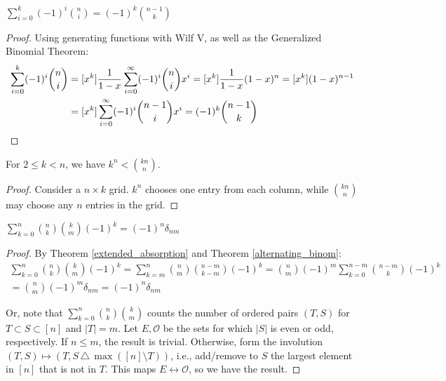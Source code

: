 \documentclass[a4paper]{article}
\begin{document}
\begin{theorem}\label{truncate_alt_binom}
$\displaystyle\sum_{i=0}^k(-1)^i\binom ni=(-1)^k\binom{n-1}k$

\begin{hl}
\begin{proof}
Using generating functions with Wilf V, as well as the Generalized Binomial Theorem:
\begin{align*}
\sum_{i=0}^k(-1)^i\binom ni
&=[x^k]\frac1{1-x}\sum_{i=0}^\infty (-1)^i\binom ni x^i
=[x^k]\frac1{1-x}(1-x)^n
=[x^k](1-x)^{n-1}\\
&=[x^k]\sum_{i=0}^\infty(-1)^i\binom{n-1}ix^i
=(-1)^k\binom{n-1}k\qedhere
\end{align*}
\end{proof}
\end{hl}
\end{theorem}

\begin{example}
For $2\leq k<n$, we have $k^n<\binom{kn}n$.

\begin{hl}
\begin{proof}
Consider a $n\times k$ grid. $k^n$ chooses one entry from each column, while $\binom{kn}n$ may choose any $n$ entries in the grid.
\end{proof}
\end{hl}

\begin{lemma}\label{bin_inv_prep_1}
$\displaystyle\sum_{k=0}^n\binom nk\binom km(-1)^k=(-1)^n\delta_{nm}$

\begin{hl}
\begin{proof}
By Theorem \ref{extended_absorption} and Theorem \ref{alternating_binom}:
\begin{multline*}
\sum_{k=0}^n\binom nk\binom km(-1)^k
=\sum_{k=m}^n\binom nm\binom{n-m}{k-m}(-1)^k
=\binom nm(-1)^m\sum_{k=0}^{n-m}\binom{n-m}{k}(-1)^k\\
=\binom nm(-1)^m\delta_{nm}
=(-1)^n\delta_{nm}
\end{multline*}

Or, note that $\sum_{k=0}^n\binom nk\binom km$ counts the number of ordered pairs $(T,S)$ for $T\subset S\subset [n]$ and $|T|=m$. Let $E,\mathcal O$ be the sets for which $|S|$ is even or odd, respectively. If $n\leq m$, the result is trivial. Otherwise, form the involution $(T,S)\mapsto (T, S\,\triangle\,\max([n]\setminus T))$, i.e., add/remove to $S$ the largest element in $[n]$ that is not in $T$. This maps $E\leftrightarrow\mathcal O$, so we have the result.
\end{proof}
\end{hl}
\end{lemma}
\end{example}
\end{document}
